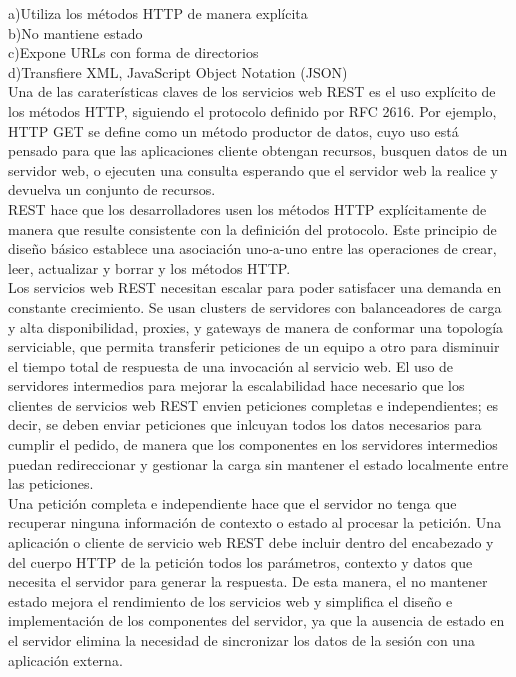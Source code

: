 \documentclass[12pt,letterpaper,titlepage]{article}
\begin{document}
\begin{itemize}
\begin{itemize}
a)Utiliza los métodos HTTP de manera explícita\\
b)No mantiene estado \\
c)Expone URLs con forma de directorios \\
d)Transfiere XML, JavaScript Object Notation (JSON)\\

Una de las caraterísticas claves de los servicios web REST es el uso explícito de los métodos HTTP, siguiendo el protocolo definido por RFC 2616. Por ejemplo, HTTP GET se define como un método productor de datos, cuyo uso está pensado para que las aplicaciones cliente obtengan recursos, busquen datos de un servidor web, o ejecuten una consulta esperando que el servidor web la realice y devuelva un conjunto de recursos.\\

REST hace que los desarrolladores usen los métodos HTTP explícitamente de manera que resulte consistente con la definición del protocolo. Este principio de diseño básico establece una asociación uno-a-uno entre las operaciones de crear, leer, actualizar y borrar y los métodos HTTP.\\

Los servicios web REST necesitan escalar para poder satisfacer una demanda en constante crecimiento. Se usan clusters de servidores con balanceadores de carga y alta disponibilidad, proxies, y gateways de manera de conformar una topología serviciable, que permita transferir peticiones de un equipo a otro para disminuir el tiempo total de respuesta de una invocación al servicio web. El uso de servidores intermedios para mejorar la escalabilidad hace necesario que los clientes de servicios web REST envien peticiones completas e independientes; es decir, se deben enviar peticiones que inlcuyan todos los datos necesarios para cumplir el pedido, de manera que los componentes en los servidores intermedios puedan redireccionar y gestionar la carga sin mantener el estado localmente entre las peticiones.\\

Una petición completa e independiente hace que el servidor no tenga que recuperar ninguna información de contexto o estado al procesar la petición. Una aplicación o cliente de servicio web REST debe incluir dentro del encabezado y del cuerpo HTTP de la petición todos los parámetros, contexto y datos que necesita el servidor para generar la respuesta. De esta manera, el no mantener estado mejora el rendimiento de los servicios web y simplifica el diseño e implementación de los componentes del servidor, ya que la ausencia de estado en el servidor elimina la necesidad de sincronizar los datos de la sesión con una aplicación externa.\\


\end{itemize}
\end{itemize}
\end{document}
